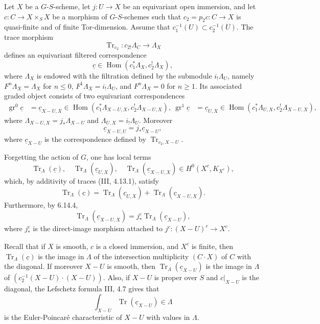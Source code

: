 \documentclass[11pt]{article}
\theoremstyle{plain}
\theoremstyle{definition}
\theoremstyle{remark}
\DeclareMathOperator{\Hom}{Hom}
\DeclareMathOperator{\Tr}{Tr}
\DeclareMathOperator{\gr}{gr}
\begin{document}
Let $X$ be a $G$-$S$-scheme, let $j:U\to X$ be an equivariant open immersion, and let
$c:C\to X\times_S X$ be a morphism of $G$-$S$-schemes such that
$c_2=p_2c:C\to X$ is quasi-finite and of finite Tor-dimension. Assume that
$c_1^{-1}(U)\subset c_2^{-1}(U)$. The trace morphism
\[
      \Tr_{c_2}:c_{2!}\Lambda_C\longrightarrow \Lambda_X
\]
defines an equivariant filtered correspondence
\begin{equation}\tag{6.14.2}
      \underline c\in\Hom(c_1^*\Lambda_X,c_2^{!}\Lambda_X),
\end{equation}
where $\Lambda_X$ is endowed with the filtration defined by the submodule
$i_!\Lambda_U$, namely $F^n\Lambda_X=\Lambda_X$ for $n\le0$,
$F^1\Lambda_X=i_!\Lambda_U$, and $F^n\Lambda_X=0$ for $n\ge1$. Its associated
graded object consists of two equivariant correspondences
\begin{align}
\gr^0\underline c&=\underline c_{X-U,X}
   \in\Hom(c_1^*\Lambda_{X-U,X},c_2^{!}\Lambda_{X-U,X}),\tag{6.14.3}\
\gr^1\underline c&=\underline c_{U,X}
   \in\Hom(c_1^*\Lambda_{U,X},c_2^{!}\Lambda_{X-U,X}),
\end{align}
where $\Lambda_{X-U,X}=j_*\Lambda_{X-U}$ and
$\Lambda_{U,X}=i_!\Lambda_U$. Moreover
\begin{equation}\tag{6.14.4}
        \underline c_{X-U,U}=j_*\underline c_{X-U},
\end{equation}
where $\underline c_{X-U}$ is the correspondence defined by
$\Tr_{c_2,X-U}$.

Forgetting the action of $G$, one has local terms
\begin{equation}\tag{6.14.5}
\Tr_\Lambda(\underline c),\quad
\Tr_\Lambda(\underline c_{U,X}),\quad
\Tr_\Lambda(\underline c_{X-U,X})\in H^0(X^c,K_{X^c}),
\end{equation}
which, by additivity of traces (III, 4.13.1), satisfy
\begin{equation}\tag{6.14.6}
\Tr_\Lambda(\underline c)=\Tr_\Lambda(\underline c_{U,X})
+\Tr_\Lambda(\underline c_{X-U,X}).
\end{equation}
Furthermore, by 6.14.4,
\begin{equation}\tag{6.14.7}
\Tr_\Lambda(\underline c_{X-U,X})=j_*^c\Tr_\Lambda(\underline c_{X-U}),
\end{equation}
where $j_*^c$ is the direct-image morphism attached to
$j^c:(X-U)^c\to X^c$.

Recall that if $X$ is smooth, $c$ is a closed immersion, and $X^c$ is finite, then
$\Tr_\Lambda(\underline c)$ is the image in $\Lambda$ of the intersection multiplicity
$(C\cdot X)$ of $C$ with the diagonal. If moreover $X-U$ is smooth, then
$\Tr_\Lambda(\underline c_{X-U})$ is the image in $\Lambda$ of
$(c_2^{-1}(X-U)\cdot (X-U))$. Also, if $X-U$ is proper over $S$ and
$c|_{X-U}$ is the diagonal, the Lefschetz formula III, 4.7 gives that
\[
     \int_{X-U}\Tr(\underline c_{X-U})\in\Lambda
\]
is the Euler-Poincaré characteristic of $X-U$ with values in $\Lambda$.
\end{document}

